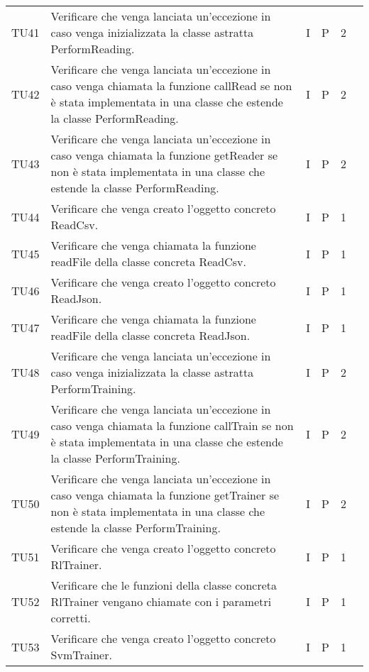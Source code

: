 \begin{longtable} {
		>{}p{12mm}
		>{}p{79.5mm}
		>{}p{9mm}
		>{}p{8mm}
		>{}p{14mm}
		>{}p{0mm}}
	TU41		& Verificare che venga lanciata un'eccezione in caso venga inizializzata la classe astratta PerformReading. & I & P & 2 & \TBstrut \\ [2mm]
	TU42		& Verificare che venga lanciata un'eccezione in caso venga chiamata la funzione callRead se non è stata implementata in una classe che estende la classe PerformReading. & I & P & 2 & \TBstrut \\ [2mm]
	TU43		& Verificare che venga lanciata un'eccezione in caso venga chiamata la funzione getReader se non è stata implementata in una classe che estende la classe PerformReading. & I & P & 2 & \TBstrut \\ [2mm]
	TU44		& Verificare che venga creato l'oggetto concreto ReadCsv. & I & P & 1 & \TBstrut \\ [2mm]
	TU45		& Verificare che venga chiamata la funzione readFile della classe concreta ReadCsv. & I & P & 1 & \TBstrut \\ [2mm]
	TU46		& Verificare che venga creato l'oggetto concreto ReadJson. & I & P & 1 & \TBstrut \\ [2mm]
	TU47		& Verificare che venga chiamata la funzione readFile della classe concreta ReadJson. & I & P & 1 & \TBstrut \\ [2mm]
	TU48		& Verificare che venga lanciata un'eccezione in caso venga inizializzata la classe astratta PerformTraining. & I & P & 2 & \TBstrut \\ [2mm]
	TU49		& Verificare che venga lanciata un'eccezione in caso venga chiamata la funzione callTrain se non è stata implementata in una classe che estende la classe PerformTraining. & I & P & 2 & \TBstrut \\ [2mm]
	TU50		& Verificare che venga lanciata un'eccezione in caso venga chiamata la funzione getTrainer se non è stata implementata in una classe che estende la classe PerformTraining. & I & P & 2 & \TBstrut \\ [2mm]
	TU51		& Verificare che venga creato l'oggetto concreto RlTrainer. & I & P & 1 & \TBstrut \\ [2mm]
	TU52		& Verificare che le funzioni della classe concreta RlTrainer vengano chiamate con i parametri corretti. & I & P & 1 & \TBstrut \\ [2mm]
	TU53		& Verificare che venga creato l'oggetto concreto SvmTrainer. & I & P & 1 & \TBstrut \\ [2mm]

\end{longtable}
